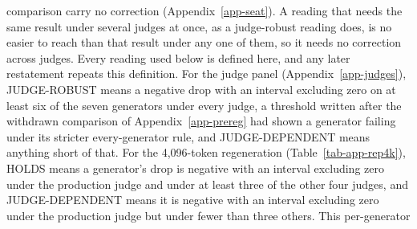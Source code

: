 comparison carry no correction (Appendix~\ref{app-seat}). A reading that
needs the same result under several judges at once, as a judge-robust reading
does, is no easier to reach than that result under any one of them, so it
needs no correction across judges.
Every reading used below is defined here, and any later restatement repeats
this definition.
For the
judge panel (Appendix~\ref{app-judges}), JUDGE-ROBUST means a negative drop
with an interval excluding zero on at least six of the seven generators under
every judge, a threshold written after the withdrawn comparison of
Appendix~\ref{app-prereg} had shown a generator failing under its stricter
every-generator rule, and JUDGE-DEPENDENT means anything short of that.
For the 4,096-token regeneration (Table~\ref{tab-app-rep4k}), HOLDS means a
generator's drop is negative with an interval excluding zero under the
production judge and under at least three of the other four judges, and
JUDGE-DEPENDENT means it is negative with an interval excluding zero under
the production judge but under fewer than three others. This per-generator
